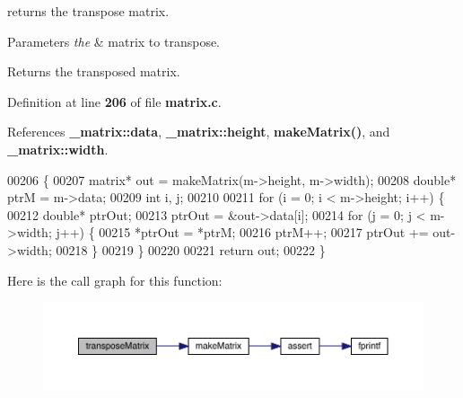 returns the transpose matrix. 


\begin{DoxyParams}{Parameters}
{\em the} & matrix to transpose. \\
\hline
\end{DoxyParams}
\begin{DoxyReturn}{Returns}
the transposed matrix. 
\end{DoxyReturn}


Definition at line \textbf{ 206} of file \textbf{ matrix.\+c}.



References \textbf{ \+\_\+matrix\+::data}, \textbf{ \+\_\+matrix\+::height}, \textbf{ make\+Matrix()}, and \textbf{ \+\_\+matrix\+::width}.


\begin{DoxyCode}
00206                                    \{
00207     matrix* out = makeMatrix(m->height, m->width);
00208     \textcolor{keywordtype}{double}* ptrM = m->data;
00209     \textcolor{keywordtype}{int} i, j;
00210 
00211     \textcolor{keywordflow}{for} (i = 0; i < m->height; i++) \{
00212         \textcolor{keywordtype}{double}* ptrOut;
00213         ptrOut = &out->data[i];
00214         \textcolor{keywordflow}{for} (j = 0; j < m->width; j++) \{
00215             *ptrOut = *ptrM;
00216             ptrM++;
00217             ptrOut += out->width;
00218         \}
00219     \}
00220 
00221     \textcolor{keywordflow}{return} out;
00222 \}
\end{DoxyCode}
Here is the call graph for this function\+:\nopagebreak
\begin{figure}[H]
\begin{center}
\leavevmode
\includegraphics[width=350pt]{matrix_8c_a2936260302742748b0639e8ec71d4d9f_cgraph}
\end{center}
\end{figure}
